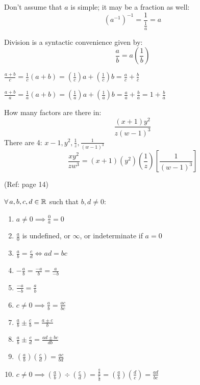 \documentclass[letterpaper,12pt,fleqn]{article}
\begin{document}
Don't assume that $a$ is simple; it may be a fraction as well:
  \[(a^{-1})^{-1}=\frac{1}{\frac{1}{a}}=a\]

\begin{definition}[Division]
  Division is a syntactic convenience given by:
  \[\frac{a}{b}=a\left(\frac{1}{b}\right)\]
\end{definition}

\begin{example}
  $\frac{a+b}{c}=\frac{1}{c}(a+b)=
  \left(\frac{1}{c}\right)a+\left(\frac{1}{c}\right)b=
  \frac{a}{c}+\frac{b}{c}$

  $\frac{a+b}{a}=\frac{1}{a}(a+b)=
  \left(\frac{1}{a}\right)a+\left(\frac{1}{a}\right)b=
  \frac{a}{a}+\frac{b}{a}=
  1+\frac{b}{a}$
\end{example}

\begin{example}
  How many factors are there in:
  \[\frac{(x+1)y^2}{z(w-1)^3}\]
  There are 4: $x-1, y^2, \frac{1}{z}, \frac{1}{(w-1)^3}$
  \[\frac{xy^2}{zw^3}=
  (x+1)(y^2)\left(\frac{1}{z}\right)\left[\frac{1}{(w-1)^3}\right]\]
\end{example}

\begin{properties}[Fractions]
  (Ref: page 14)

  $\forall\,a,b,c,d\in\mathbb{R}$ such that $b,d\ne0$:
  \begin{enumerate}
  \item $a\ne0\implies\frac{0}{a}=0$
  \item $\frac{a}{0}$ is undefined, or $\infty$, or indeterminate if $a=0$
  \item $\frac{a}{b}=\frac{c}{d}\iff ad=bc$
  \item $-\frac{a}{b}=\frac{-a}{b}=\frac{a}{-b}$
  \item $\frac{-a}{-b}=\frac{a}{b}$
  \item $c\ne0\implies\frac{a}{b}=\frac{ac}{bc}$
  \item $\frac{a}{b}\pm\frac{c}{b}=\frac{a\pm c}{b}$
  \item $\frac{a}{b}\pm\frac{c}{d}=\frac{ad\pm bc}{db}$
  \item $\left(\frac{a}{b}\right)\left(\frac{c}{d}\right)=\frac{ac}{bd}$
  \item $c\ne0\implies\left(\frac{a}{b}\right)\div\left(\frac{c}{d}\right)=
    \frac{\frac{a}{b}}{\frac{c}{d}}=
    \left(\frac{a}{b}\right)\left(\frac{d}{c}\right)=
    \frac{ad}{bc}$
  \end{enumerate}
\end{properties}
\end{document}
